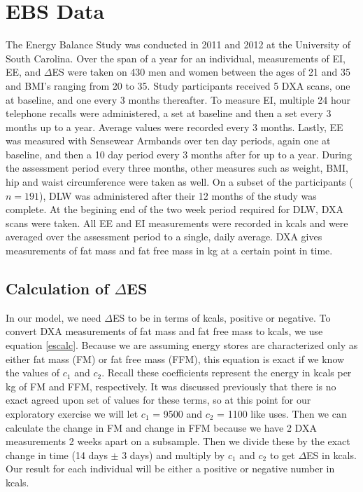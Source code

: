 \documentclass[11pt]{article}\usepackage[]{graphicx}\usepackage[]{color}
\begin{document}
\section{EBS Data}
The Energy Balance Study \cite{hand} was conducted in 2011 and 2012 at the University of South Carolina. Over the span of a year for an individual, measurements of EI, EE, and $\Delta$ES were taken on 430 men and women between the ages of 21 and 35 and BMI's ranging from 20 to 35. Study participants received 5 DXA scans, one at baseline, and one every 3 months thereafter. To measure EI, multiple 24 hour telephone recalls were administered, a set at baseline and then a set every 3 months up to a year. Average values were recorded every 3 months. Lastly, EE was measured with Sensewear Armbands over ten day periods, again one at baseline, and then a 10 day period every 3 months after for up to a year. During the assessment period every three months, other measures such as weight, BMI, hip and waist circumference were taken as well. On a subset of the participants ($n=191$), DLW was administered after their 12 months of the study was complete. At the begining end of the two week period required for DLW, DXA scans were taken. All EE and EI measurements were recorded in kcals and were averaged over the assessment period to a single, daily average. DXA gives measurements of fat mass and fat free mass in kg at a certain point in time. 

\subsection{Calculation of $\Delta$ES}

In our model, we need $\Delta$ES to be in terms of kcals, positive or negative. To convert DXA measurements of fat mass and fat free mass to kcals, we use equation \eqref{escalc}. Because we are assuming energy stores are characterized only as either fat mass (FM) or fat free mass (FFM), this equation is exact if we know the values of $c_1$ and $c_2$. Recall these coefficients represent the energy in kcals per kg of FM and FFM, respectively. It was discussed previously that there is no exact agreed upon set of values for these terms, so at this point for our exploratory exercise we will let $c_1$ = 9500 and $c_2$ = 1100 like \cite{thomas11} uses. Then we can calculate the change in FM and change in FFM because we have 2 DXA measurements 2 weeks apart on a subsample. Then we divide these by the exact change in time (14 days $\pm$ 3 days) and multiply by $c_1$ and $c_2$ to get $\Delta$ES in kcals. Our result for each individual will be either a positive or negative number in kcals.
\end{document}
